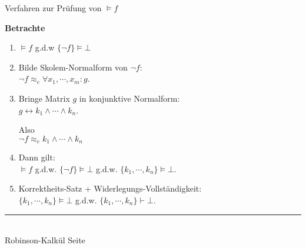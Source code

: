 \documentclass{slides}
\newcommand{\myrule}{\rule{20cm}{1mm}\\ }
\newcommand{\falsum}{\bot}
\newcounter{mypage}
\begin{document}

\begin{slide}{}
\normalsize
\begin{center}
Verfahren zur Pr\"{u}fung von $\models f$ 
\end{center}
\vspace{0.5cm}

\footnotesize
\textbf{Betrachte} 
\begin{enumerate}
\item $\models f$  \quad g.d.w \quad $\{\neg f\} \models \falsum$
\item Bilde Skolem-Normalform von $\neg f$: \\[0.3cm]
      \hspace*{1.3cm} $\neg f \approx_e \forall x_1, \cdots, x_m \colon g$.
\item Bringe Matrix $g$ in konjunktive Normalform: \\[0.3cm]
      \hspace*{1.3cm} 
      $g \leftrightarrow k_1 \wedge \cdots \wedge k_n$.

      Also \\[0.3cm]
      \hspace*{1.3cm} $\neg f \approx_e k_1 \wedge \cdots \wedge k_n$
\item Dann gilt: 
      \\[0.3cm]
      \hspace*{1.3cm}
       $\models f$ \quad g.d.w. \quad $\{\neg f\} \models \falsum$ \quad g.d.w. \quad $\{k_1,\cdots,k_n\} \models \falsum$.
\item Korrektheits-Satz + Widerlegungs-Vollst\"{a}ndigkeit:
      \\[0.3cm]
      \hspace*{1.3cm} $\{k_1,\cdots,k_n\} \models \falsum$ \quad g.d.w. \quad $\{k_1,\cdots,k_n\} \vdash \falsum$. 
\end{enumerate}

\vspace*{\fill}
\tiny \addtocounter{mypage}{1}
\myrule
Robinson-Kalk\"{u}l  \hspace*{\fill} Seite 
\end{slide}

\end{document}
